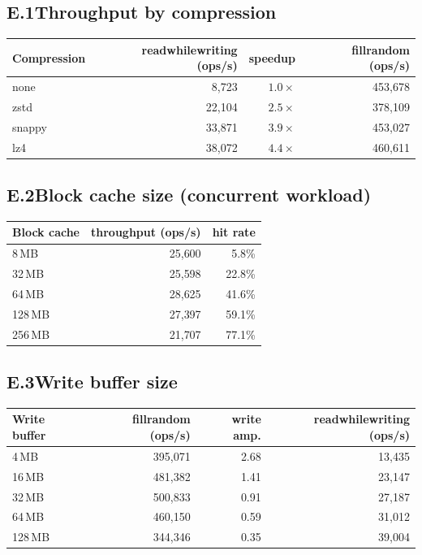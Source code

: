 \subsection*{E.1\quad Throughput by compression}
\begin{center}
\begin{tabular}{|l|r|r|r|}
\hline
\textbf{Compression} & \textbf{readwhilewriting (ops/s)} & \textbf{speedup} & \textbf{fillrandom (ops/s)} \\
\hline
none   & 8{,}723  & $1.0\times$ & 453{,}678 \\
\hline
zstd   & 22{,}104 & $2.5\times$ & 378{,}109 \\
\hline
snappy & 33{,}871 & $3.9\times$ & 453{,}027 \\
\hline
lz4    & 38{,}072 & $4.4\times$ & 460{,}611 \\
\hline
\end{tabular}
\end{center}

\subsection*{E.2\quad Block cache size (concurrent workload)}
\begin{center}
\begin{tabular}{|l|r|r|}
\hline
\textbf{Block cache} & \textbf{throughput (ops/s)} & \textbf{hit rate} \\
\hline
8\,MB   & 25{,}600 & 5.8\% \\
\hline
32\,MB  & 25{,}598 & 22.8\% \\
\hline
64\,MB  & 28{,}625 & 41.6\% \\
\hline
128\,MB & 27{,}397 & 59.1\% \\
\hline
256\,MB & 21{,}707 & 77.1\% \\
\hline
\end{tabular}
\end{center}

\subsection*{E.3\quad Write buffer size}
\begin{center}
\begin{tabular}{|l|r|r|r|}
\hline
\textbf{Write buffer} & \textbf{fillrandom (ops/s)} & \textbf{write amp.} & \textbf{readwhilewriting (ops/s)} \\
\hline
4\,MB   & 395{,}071 & 2.68 & 13{,}435 \\
\hline
16\,MB  & 481{,}382 & 1.41 & 23{,}147 \\
\hline
32\,MB  & 500{,}833 & 0.91 & 27{,}187 \\
\hline
64\,MB  & 460{,}150 & 0.59 & 31{,}012 \\
\hline
128\,MB & 344{,}346 & 0.35 & 39{,}004 \\
\hline
\end{tabular}
\end{center}

